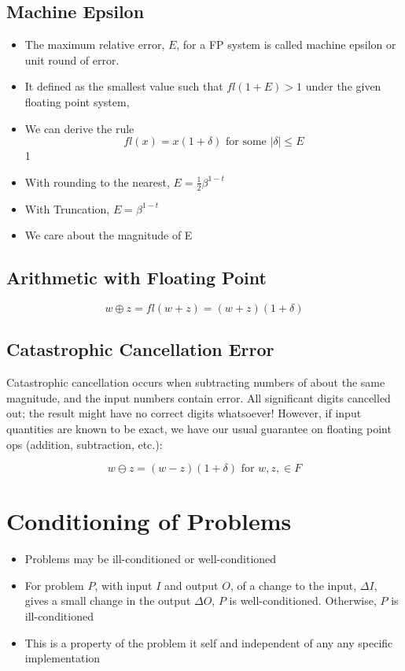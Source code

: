 \documentclass[twoside]{article}
\begin{document}
\subsection{Machine Epsilon}
\begin{itemize}
\item The maximum relative error, $E$, for a FP system is called machine epsilon or unit round of error.
\item It defined as the smallest value such that \(fl(1 + E) > 1\) under the given floating point system,
\item We can derive the rule
$$fl(x) = x (1 + \delta) \text{ for some } |\delta| \leq E $$1
\item With rounding to the nearest, $E = \frac{1}{2} \beta ^{1 -t}$
\item With Truncation, $E=\beta^{1-t}$
\item We care about the magnitude of E
\end{itemize}

\subsection{Arithmetic with Floating Point}
$$ w \oplus  z  = fl(w + z) = (w + z ) (1 + \delta) $$

\subsection{Catastrophic Cancellation Error}
Catastrophic cancellation occurs when subtracting numbers of about the same magnitude, and the input numbers contain error.
All significant digits cancelled out; the result might have no correct digits whatsoever!
However, if input quantities are known to be exact, we have our usual guarantee on floating point ops (addition, subtraction, etc.):

$$ w \ominus z  = (w - z) (1 + \delta) \text{ for } w, z, \in F$$

\section{Conditioning of Problems}
\begin{itemize}
\item Problems may be ill-conditioned or well-conditioned
\item For problem \(P\), with input \(I\) and output \(O\), of a change to the input, \(\Delta I\), gives a small change in the output \(\Delta O\), \(P\) is well-conditioned. Otherwise, \(P\) is ill-conditioned
\item This is a property of the problem it self and independent of any any specific implementation 
\end{itemize}
\end{document}
